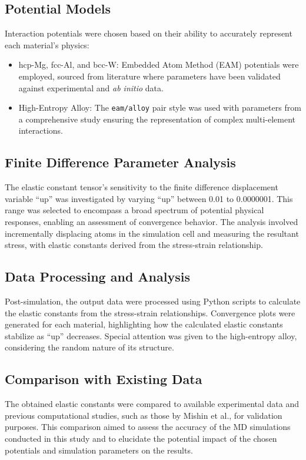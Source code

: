 \documentclass[a4paper,12pt]{article} %
\begin{document}
\subsection*{Potential Models}
Interaction potentials were chosen based on their ability to accurately represent each material's physics:
\begin{itemize}
    \item hcp-Mg, fcc-Al, and bcc-W: Embedded Atom Method (EAM) potentials were employed, sourced from literature where parameters have been validated against experimental and \textit{ab initio} data.
    \item High-Entropy Alloy: The \texttt{eam/alloy} pair style was used with parameters from a comprehensive study ensuring the representation of complex multi-element interactions.
\end{itemize}

\subsection*{Finite Difference Parameter Analysis}
The elastic constant tensor's sensitivity to the finite difference displacement variable ``up'' was investigated by varying ``up'' between 0.01 to 0.0000001. This range was selected to encompass a broad spectrum of potential physical responses, enabling an assessment of convergence behavior. The analysis involved incrementally displacing atoms in the simulation cell and measuring the resultant stress, with elastic constants derived from the stress-strain relationship.

\subsection*{Data Processing and Analysis}
Post-simulation, the output data were processed using Python scripts to calculate the elastic constants from the stress-strain relationships. Convergence plots were generated for each material, highlighting how the calculated elastic constants stabilize as ``up'' decreases. Special attention was given to the high-entropy alloy, considering the random nature of its structure.

\subsection*{Comparison with Existing Data}
The obtained elastic constants were compared to available experimental data and previous computational studies, such as those by Mishin et al., for validation purposes. This comparison aimed to assess the accuracy of the MD simulations conducted in this study and to elucidate the potential impact of the chosen potentials and simulation parameters on the results.
\end{document}
